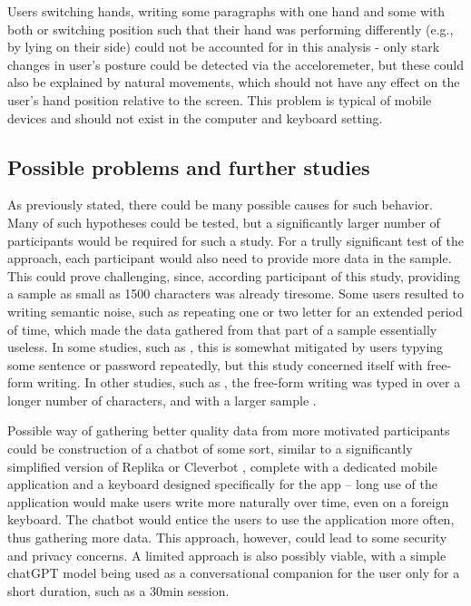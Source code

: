 Users switching hands, writing some paragraphs with one hand and some with both or switching position such that their hand was performing differently (e.g., by lying on their side) could not be accounted for in this analysis - only stark changes in user's posture could be detected via the acceloremeter, but these could also be explained by natural movements, which should not have any effect on the user's hand position relative to the screen. This problem is typical of mobile devices and should not exist in the computer and keyboard setting.

\subsection{Possible problems and further studies}
As previously stated, there could be many possible causes for such behavior. Many of such hypotheses could be tested, but a significantly larger number of participants would be required for such a study. For a trully significant test of the approach, each participant would also need to provide more data in the sample. This could prove challenging, since, according participant of this study, providing a sample as small as 1500 characters was already tiresome. Some users resulted to writing semantic noise, such as repeating one or two letter for an extended period of time, which made the data gathered from that part of a sample essentially useless. In some studies, such as , this is somewhat mitigated by users typying some sentence or password repeatedly, but this study concerned itself with free-form writing. In other studies, such as , the free-form writing was typed in over a longer number of characters, and with a larger sample .

Possible way of gathering better quality data from more motivated participants could be construction of a chatbot of some sort, similar to a significantly simplified version of Replika or Cleverbot , complete with a dedicated mobile application and a keyboard designed specifically for the app -- long use of the application would make users write more naturally over time, even on a foreign keyboard. The chatbot would entice the users to use the application more often, thus gathering more data. This approach, however, could lead to some security and privacy concerns. A limited approach is also possibly viable, with a simple chatGPT model being used as a conversational companion for the user only for a short duration, such as a 30min session.

